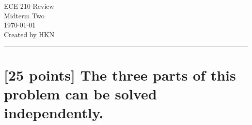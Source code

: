 \documentclass[12pt,letterpaper, onecolumn]{exam}
\begin{document}
\begingroup  
    \centering
    \LARGE ECE 210 Review\\
    \LARGE Midterm Two\\[0.5em]
    \large \today\\[0.5em]
    \large Created by HKN\par
\endgroup
\rule{\textwidth}{0.4pt}

\pointsdroppedatright
\printanswers
\renewcommand{\solutiontitle}{\noindent\textbf{}\enspace}

\newcommand\myNIA[4]{%
    \draw #2 coordinate(#1-in) to[short] ++(1,0)
    node[op amp, noinv input up, anchor=+](#1-OA){\texttt{#1}}
    (#1-OA.-) -- ++(0,-1) coordinate(#1-FB)
    to[R=#3] ++(0,-2) node[ground]{}
    (#1-FB) to[R=#4, *-] (#1-FB -| #1-OA.out) -- (#1-OA.out)
    to [short, *-] ++(1,0) coordinate(#1-out)
    ;
}

\section{[25 points] The three parts of this problem can be solved independently.}
\end{document}
